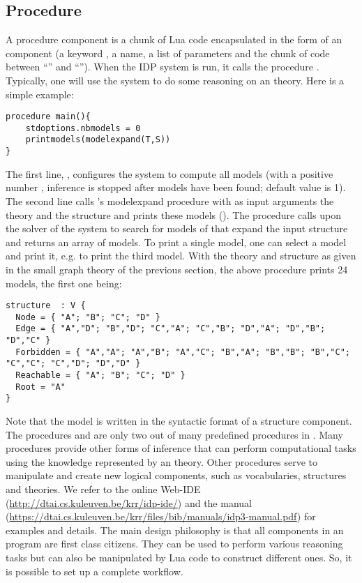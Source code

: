 \subsection{Procedure}\label{sec:procedure}

A procedure component is a chunk of Lua code \cite{SPE/IerusalimschyFC96} 
encapsulated in the form of an \idp component (a keyword
, a name, a list of parameters and the chunk of code
between ``\il{\{}'' and ``\il{\}}''). When the IDP system is run, it
calls the procedure . Typically, one will use the \idp system
to do some reasoning on an \foidaggpft theory. Here is a simple example:

\begin{lstlisting}
procedure main(){
	stdoptions.nbmodels = 0
	printmodels(modelexpand(T,S)) 
}   
\end{lstlisting}

The first line, , configures the \idp
system to compute all models (with a positive number , inference is
stopped after  models have been found; default value is 1). The
second line calls \idp's modelexpand procedure with as input arguments the theory  and the structure  and prints these models
(). The  procedure calls upon the
solver of the \idp system to search for models of  that expand the
input structure  and returns an array of models. To print a single
model, one can select a model and print it,
e.g.  to print the third model. With
the theory and structure as given in the small graph theory of the
previous section, the above procedure prints 24 models, the first one
being:
\begin{lstlisting}
structure  : V {
  Node = { "A"; "B"; "C"; "D" }
  Edge = { "A","D"; "B","D"; "C","A"; "C","B"; "D","A"; "D","B"; "D","C" }
  Forbidden = { "A","A"; "A","B"; "A","C"; "B","A"; "B","B"; "B","C"; "C","C"; "C","D"; "D","D" }
  Reachable = { "A"; "B"; "C"; "D" }
  Root = "A"
}
\end{lstlisting}
Note that the model is written in the syntactic format of  a structure component. The procedures 
 and  are only  two out of many
predefined procedures in \idp. Many procedures provide other forms of inference that can perform
computational tasks  using the knowledge represented by an
\foidaggpft theory. Other procedures serve  to manipulate and create new logical
components, such as vocabularies, structures and theories. We refer to
the online \idp Web-IDE
(\url{http://dtai.cs.kuleuven.be/krr/idp-ide/}) and the \idp
manual
(\url{https://dtai.cs.kuleuven.be/krr/files/bib/manuals/idp3-manual.pdf})
for examples and details.  The main design philosophy is that all
components in an \idp program are first class citizens. They can be used
to perform various reasoning tasks but can also be manipulated by Lua code to
construct different ones. So, it is possible to set up a complete
workflow. 

